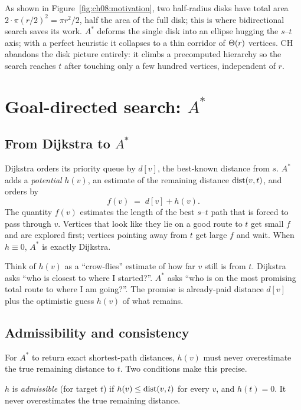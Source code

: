 As shown in Figure~\ref{fig:ch08:motivation}, two half-radius disks have total area $2\cdot\pi(r/2)^2 = \pi r^2/2$, half the
area of the full disk; this is where bidirectional search saves its work. $A^*$ deforms
the single disk into an ellipse hugging the $s$--$t$ axis; with a perfect
heuristic it collapses to a thin corridor of $\Theta(r)$ vertices. CH abandons the
disk picture entirely: it climbs a precomputed hierarchy so the search reaches
$t$ after touching only a few hundred vertices, independent of $r$.

\section{Goal-directed search: \texorpdfstring{$A^*$}{A*}}
\label{ch08:astar}

\subsection{From Dijkstra to \texorpdfstring{$A^*$}{A*}}

Dijkstra orders its priority queue by $d[v]$, the best-known distance from $s$.
$A^*$ adds a \emph{potential} $h(v)$, an estimate of the remaining distance
$\operatorname{dist}(v,t)$, and orders by
\[
  f(v) \;=\; d[v] + h(v).
\]
The quantity $f(v)$ estimates the length of the best $s$--$t$ path that is forced
to pass through $v$. Vertices that look like they lie on a good route to $t$ get
small $f$ and are explored first; vertices pointing away from $t$ get large $f$
and wait. When $h\equiv 0$, $A^*$ is exactly Dijkstra.

\begin{intuitionbox}
Think of $h(v)$ as a ``crow-flies'' estimate of how far $v$ still is from $t$.
Dijkstra asks ``who is closest to where I started?''. $A^*$ asks ``who is on the
most promising total route to where I am going?''. The promise is
already-paid distance $d[v]$ plus the optimistic guess $h(v)$ of what remains.
\end{intuitionbox}

\subsection{Admissibility and consistency}

For $A^*$ to return exact shortest-path distances, $h(v)$ must never overestimate the true
remaining distance to $t$. Two conditions make this precise.

\begin{definition}
\label{ch08:def-admissible}
$h$ is \emph{admissible} (for target $t$) if $h(v)\le \operatorname{dist}(v,t)$ for every $v$,
and $h(t)=0$. It never overestimates the true remaining distance.
\end{definition}

